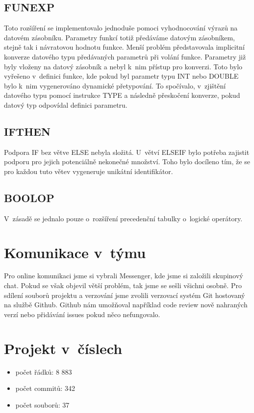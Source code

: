 \documentclass[a4paper,11pt,leqno]{article}
\begin{document}
\subsection{FUNEXP}
Toto rozšíření se implementovalo jednoduše pomoci vyhodnocování výrazů na datovém zásobníku.
Parametry funkcí totiž předáváme datovým zásobníkem, stejně tak i návratovou hodnotu funkce.
Menší problém představovala implicitní konverze datového typu předávaných parametrů při volání funkce.
Parametry již byly vloženy na datový zásobník a nebyl k~nim přístup pro konverzi.
Toto bylo vyřešeno v~definici funkce, kde pokud byl parametr typu INT nebo DOUBLE bylo k nim vygenerováno dynamické přetypování. To spočívalo, v zjištění datového typu pomocí instrukce TYPE a následně přeskočení konverze, pokud datový typ odpovídal definici parametru.
\subsection{IFTHEN}
Podpora IF bez větve ELSE nebyla složitá. U~větví ELSEIF bylo potřeba zajistit podporu pro jejich potenciálně nekonečné množství. Toho bylo docíleno tím, že se pro každou tuto větev vygeneruje unikátní identifikátor.
\subsection{BOOLOP}
V~zásadě se jednalo pouze o~rozšíření precedenční tabulky o~logické operátory.
\section{Komunikace v~týmu}
Pro online komunikaci jsme si vybrali Messenger, kde jsme si založili skupinový chat. Pokud se však objevil větší problém, tak jsme se sešli všichni osobně.
Pro sdílení souborů projektu a verzování jsme zvolili verzovací systém Git hostovaný na službě Github. Github nám umožňoval například code review nově nahraných verzí nebo přidávání issues pokud něco nefungovalo.
\section{Projekt v číslech}
\begin{itemize}
	\item{počet řádků: 8 883}
	\item{počet commitů: 342}
	\item{počet souborů: 37}
\end{itemize}
\end{document}
